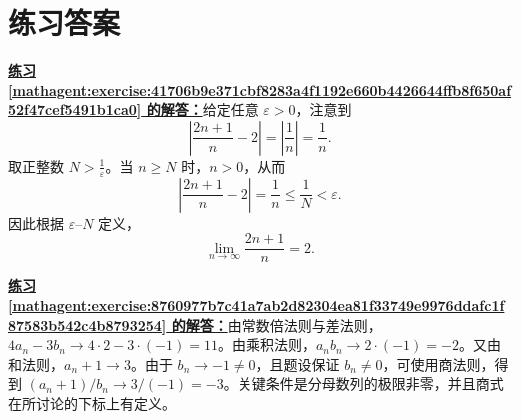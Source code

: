 \documentclass[UTF8,fontset=fandol,11pt]{ctexart}
\begin{document}
\section*{练习答案}
\par\noindent\textbf{\hyperref[mathagent:exercise:41706b9e371cbf8283a4f1192e660b4426644ffb8f650af52f47cef5491b1ca0]{练习 \ref*{mathagent:exercise:41706b9e371cbf8283a4f1192e660b4426644ffb8f650af52f47cef5491b1ca0} 的解答：}}给定任意 $\varepsilon>0$，注意到
\[
\left|\frac{2n+1}{n}-2\right|=\left|\frac{1}{n}\right|=\frac{1}{n}.
\]
取正整数 $N>\frac{1}{\varepsilon}$。当 $n\geq N$ 时，$n>0$，从而
\[
\left|\frac{2n+1}{n}-2\right|=\frac{1}{n}\leq\frac{1}{N}<\varepsilon.
\]
因此根据 $\varepsilon$--$N$ 定义，
\[
\lim_{n\to\infty}\frac{2n+1}{n}=2.
\]\par
\par\noindent\textbf{\hyperref[mathagent:exercise:8760977b7c41a7ab2d82304ea81f33749e9976ddafc1f87583b542c4b8793254]{练习 \ref*{mathagent:exercise:8760977b7c41a7ab2d82304ea81f33749e9976ddafc1f87583b542c4b8793254} 的解答：}}由常数倍法则与差法则，$4a_n-3b_n\to4\cdot2-3\cdot(-1)=11$。由乘积法则，$a_nb_n\to2\cdot(-1)=-2$。又由和法则，$a_n+1\to3$。由于 $b_n\to-1\neq0$，且题设保证 $b_n\neq0$，可使用商法则，得到 $(a_n+1)/b_n\to3/(-1)=-3$。关键条件是分母数列的极限非零，并且商式在所讨论的下标上有定义。\par
\end{document}
